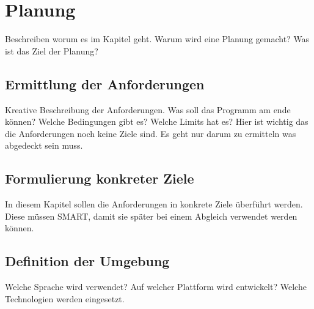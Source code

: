 
\chapter{Planung}\label{cha:Planung}
Beschreiben worum es im Kapitel geht. Warum wird eine Planung gemacht? Was ist das Ziel der Planung?

\section{Ermittlung der Anforderungen}
Kreative Beschreibung der Anforderungen. Was soll das Programm am ende können? Welche Bedingungen gibt es? Welche Limits hat es? Hier ist wichtig das die Anforderungen noch keine Ziele sind. Es geht nur darum zu ermitteln was abgedeckt sein muss.

\section{Formulierung konkreter Ziele}
In diesem Kapitel sollen die Anforderungen in konkrete Ziele überführt werden. Diese müssen SMART, damit sie später bei einem Abgleich verwendet werden können.

\section{Definition der Umgebung}
Welche Sprache wird verwendet? Auf welcher Plattform wird entwickelt? Welche Technologien werden eingesetzt.